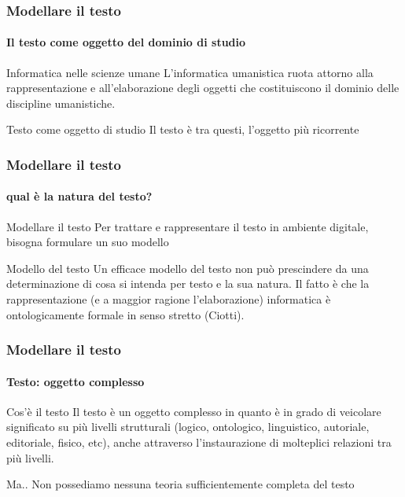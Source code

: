 
\begin{frame}
	\frametitle{Modellare il testo}
	\framesubtitle{Il testo come oggetto del dominio di studio}
	\addtocounter{nframe}{1}

	\begin{block}{Informatica nelle scienze umane}
		L'informatica umanistica ruota attorno alla rappresentazione e all'elaborazione degli oggetti che costituiscono il dominio delle discipline umanistiche.
	\end{block}

	\begin{block}{Testo come oggetto di studio}
		Il testo è tra questi, l'oggetto più ricorrente
	\end{block}

\end{frame}

\begin{frame}
	\frametitle{Modellare il testo}
	\framesubtitle{qual è la natura del testo?}
	\addtocounter{nframe}{1}

	\begin{block}{Modellare il testo}
		Per trattare e rappresentare il testo in ambiente digitale, bisogna formulare un suo modello
	\end{block}

	\begin{block}{Modello del testo}
		Un efficace modello del testo non può prescindere da una determinazione di cosa si intenda per testo e la sua natura. Il fatto è che la rappresentazione (e a maggior ragione l’elaborazione) informatica è ontologicamente formale in senso stretto (Ciotti).
	\end{block}

\end{frame}

\begin{frame}
	\frametitle{Modellare il testo}
	\framesubtitle{Testo: oggetto complesso}
	\addtocounter{nframe}{1}

	\begin{block}{Cos'è il testo}
		Il testo è un oggetto complesso in quanto è in grado di veicolare significato su più livelli strutturali (logico, ontologico, linguistico, autoriale, editoriale, fisico, etc), anche attraverso l’instaurazione di molteplici relazioni tra più livelli.
	\end{block}

	\begin{block}{Ma..}
		Non possediamo nessuna teoria sufficientemente completa del testo
	\end{block}

\end{frame}

